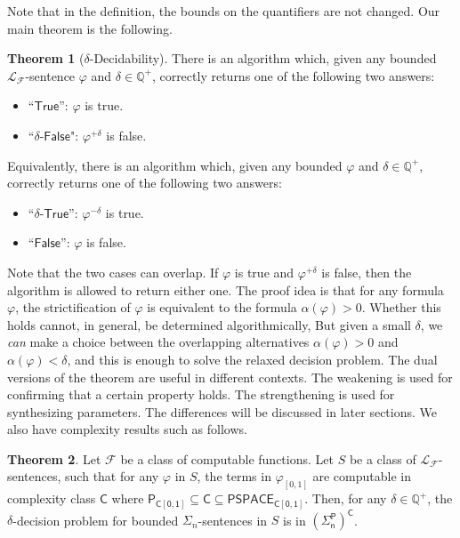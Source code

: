 \documentclass[10pt]{article}
\theoremstyle{definition}
\newtheorem{theorem}{Theorem}[section]
\begin{document}
Note that in the definition, the bounds on the quantifiers are not changed. Our main theorem is the following. 
\begin{theorem}[$\delta$-Decidability]\label{main}
There is an algorithm which, given any bounded $\mathcal{L}_{\mathcal{F}}$-sentence $\varphi$ and $\delta\in \mathbb{Q}^+$, correctly returns one of the following two answers:
\begin{itemize}
\item ``$\mathsf{True}$'': $\varphi$ is true. 
\item ``$\delta$-$\mathsf{False}$": $\varphi^{+\delta}$ is false. 
\end{itemize}
Equivalently, there is an algorithm which, given any bounded $\varphi$ and $\delta\in \mathbb{Q}^+$, correctly returns one of the following two answers:
\begin{itemize}
\item ``$\delta$-$\mathsf{True}$'': $\varphi^{-\delta}$ is true. 
\item ``$\mathsf{False}$'': $\varphi$ is false. 
\end{itemize}
\end{theorem}
Note that the two cases can overlap. If $\varphi$ is true and $\varphi^{+\delta}$ is false, then the algorithm is allowed to return either one. The proof idea is that for any formula $\varphi$, the strictification of $\varphi$ is equivalent to the formula $\alpha(\varphi) > 0$. Whether this holds cannot, in general, be determined algorithmically, But given a small $\delta$, we {\em can} make a choice between the overlapping alternatives $\alpha(\varphi) > 0$ and $\alpha(\varphi) < \delta$, and this is enough to solve the relaxed decision problem. The dual versions of the theorem are useful in different contexts. The weakening is used for confirming that a certain property holds. The strengthening is used for synthesizing parameters. The differences will be discussed in later sections. We also have complexity results such as follows.
\begin{theorem}\label{compmain}
Let $\mathcal{F}$ be a class of computable functions. Let $S$ be a class of $\mathcal{L}_{\mathcal{F}}$-sentences, such that for any $\varphi$ in $S$, the terms in $\varphi_{[0,1]}$ are computable in complexity class $\mathsf{C}$ where $\mathsf{P_{C[0,1]}\subseteq \mathsf{C}\subseteq \mathsf{PSPACE_{C[0,1]}}}$. Then, for any $\delta\in \mathbb{Q}^+$, the $\delta$-decision problem for bounded $\Sigma_n$-sentences in $S$ is in $\mathsf{(\Sigma_n^P)^C}$.
\end{theorem}
\end{document}
